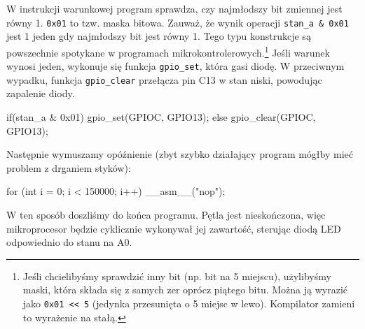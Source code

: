 W instrukcji warunkowej program sprawdza, czy najmłodszy bit zmiennej jest równy 1. \texttt{0x01} to tzw. maska bitowa.
Zauważ, że wynik operacji \texttt{\Verb$stan_a & 0x01$} jest 1 jeden gdy najmłodszy bit jest równy 1. Tego typu
konstrukcje są powszechnie spotykane w programach mikrokontrolerowych.\footnote{
	Jeśli chcielibyśmy sprawdzić inny bit (np. bit na 5 miejscu), użylibyśmy maski, która składa się z samych zer oprócz piątego bitu.
	Można ją wyrazić jako \Verb$0x01 << 5$ (jedynka przesunięta o 5 miejsc w lewo). Kompilator zamieni to wyrażenie na stałą.
}
Jeśli warunek wynosi jeden, wykonuje się funkcja \Verb$gpio_set$, która gasi diodę. W przeciwnym wypadku, funkcja
\Verb$gpio_clear$ przełącza pin C13 w stan niski, powodując zapalenie diody.

\begin{CodeFrame*}[c]{}
    if(stan_a & 0x01){
      gpio_set(GPIOC, GPIO13);
    }else{
      gpio_clear(GPIOC, GPIO13);
    }
\end{CodeFrame*}

Następnie wymuszamy opóźnienie (zbyt szybko działający program mógłby mieć problem z drganiem styków):

\begin{CodeFrame*}[c]{}
    for (int i = 0; i < 150000; i++) __asm__("nop");
\end{CodeFrame*}

W ten sposób doszliśmy do końca programu. Pętla jest nieskończona, więc mikroprocesor będzie cyklicznie wykonywał
jej zawartość, sterując diodą LED odpowiednio do stanu na A0.
